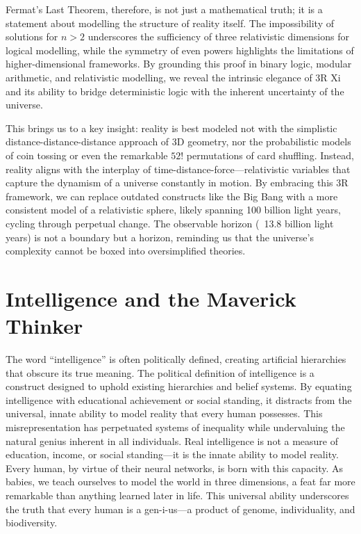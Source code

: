 \documentclass[12pt]{article}
\begin{document}
Fermat’s Last Theorem, therefore, is not just a mathematical truth; it is a statement about modelling the structure of reality itself. The impossibility of solutions for \(n > 2\) underscores the sufficiency of three relativistic dimensions for logical modelling, while the symmetry of even powers highlights the limitations of higher-dimensional frameworks. By grounding this proof in binary logic, modular arithmetic, and relativistic modelling, we reveal the intrinsic elegance of 3R Xi and its ability to bridge deterministic logic with the inherent uncertainty of the universe.

This brings us to a key insight: reality is best modeled not with the simplistic distance-distance-distance approach of 3D geometry, nor the probabilistic models of coin tossing or even the remarkable \(52!\) permutations of card shuffling. Instead, reality aligns with the interplay of time-distance-force—relativistic variables that capture the dynamism of a universe constantly in motion. By embracing this 3R framework, we can replace outdated constructs like the Big Bang with a more consistent model of a relativistic sphere, likely spanning 100 billion light years, cycling through perpetual change. The observable horizon (~13.8 billion light years) is not a boundary but a horizon, reminding us that the universe’s complexity cannot be boxed into oversimplified theories.

\section*{Intelligence and the Maverick Thinker}

The word “intelligence” is often politically defined, creating artificial hierarchies that obscure its true meaning. The political definition of intelligence is a construct designed to uphold existing hierarchies and belief systems. By equating intelligence with educational achievement or social standing, it distracts from the universal, innate ability to model reality that every human possesses. This misrepresentation has perpetuated systems of inequality while undervaluing the natural genius inherent in all individuals. Real intelligence is not a measure of education, income, or social standing—it is the innate ability to model reality. Every human, by virtue of their neural networks, is born with this capacity. As babies, we teach ourselves to model the world in three dimensions, a feat far more remarkable than anything learned later in life. This universal ability underscores the truth that every human is a gen-i-us—a product of genome, individuality, and biodiversity.
\end{document}
